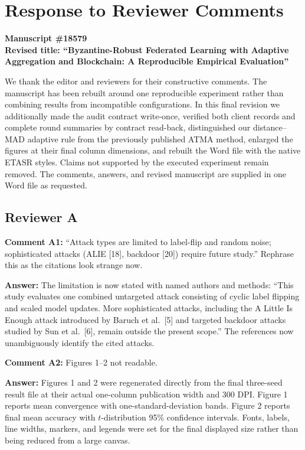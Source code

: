 \documentclass[10pt,letterpaper]{article}
\begin{document}
\section*{Response to Reviewer Comments}
\textbf{Manuscript \#18579}\\
\textbf{Revised title: ``Byzantine-Robust Federated Learning with Adaptive Aggregation and Blockchain: A Reproducible Empirical Evaluation''}

We thank the editor and reviewers for their constructive comments. The manuscript
has been rebuilt around one reproducible experiment rather than combining results
from incompatible configurations. In this final revision we additionally made the
audit contract write-once, verified both client records and complete round
summaries by contract read-back, distinguished our distance--MAD adaptive rule
from the previously published ATMA method, enlarged the figures at their final
column dimensions, and rebuilt the Word file with the native ETASR styles. Claims
not supported by the executed experiment remain removed. The comments, answers,
and revised manuscript are supplied in one Word file as requested.

\subsection*{Reviewer A}
\textbf{Comment A1:} ``Attack types are limited to label-flip and random noise;
sophisticated attacks (ALIE [18], backdoor [20]) require future study.'' Rephrase
this as the citations look strange now.

\textbf{Answer:} The limitation is now stated with named authors and methods:
``This study evaluates one combined untargeted attack consisting of cyclic label
flipping and scaled model updates. More sophisticated attacks, including the A
Little Is Enough attack introduced by Baruch et al.~[5] and targeted backdoor
attacks studied by Sun et al.~[6], remain outside the present scope.'' The
references now unambiguously identify the cited attacks.

\textbf{Comment A2:} Figures 1--2 not readable.

\textbf{Answer:} Figures 1 and 2 were regenerated directly from the final
three-seed result file at their actual one-column publication width and 300 DPI.
Figure 1 reports mean convergence with one-standard-deviation bands. Figure 2
reports final mean accuracy with $t$-distribution 95\% confidence intervals.
Fonts, labels, line widths, markers, and legends were set for the final displayed
size rather than being reduced from a large canvas.
\end{document}
